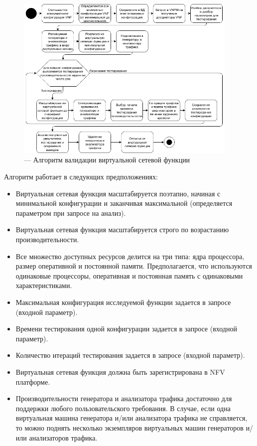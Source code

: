 \documentclass[oneside,final,14pt,a4paper]{extreport}
\begin{document}
\begin{figure}[h]
	\centering
	\includegraphics[width=0.95\textwidth]{analyse_vnf_algorithm}
	\caption{--- Алгоритм валидации виртуальной сетевой функции}
	\label{pic:analyse_vnf_algorithm}
\end{figure}

Алгоритм работает в следующих предположениях:
\begin{itemize}
    \item Виртуальная сетевая функция масштабируется поэтапно, начиная с минимальной конфигурации и заканчивая максимальной (определяется параметром при запросе на анализ).
    \item Виртуальная сетевая функция масштабируется строго по возрастанию производительности. 
    \item Все множество доступных ресурсов делится на три типа: ядра процессора, размер оперативной и постоянной памяти. Предполагается, что используются одинаковые процессоры, оперативная и постоянная память с одинаковыми характеристиками.
    \item Максимальная конфигурация исследуемой функции задается в запросе (входной параметр).
    \item Времени тестирования одной конфигурации задается в запросе (входной параметр).
    \item Количество итераций тестирования задается в запросе (входной параметр).
    \item Виртуальная сетевая функция должна быть зарегистрирована в NFV платформе.
    \item Производительности генератора и анализатора трафика достаточно для поддержки любого пользовательского требования. В случае, если одна виртуальная машина генератора и/или анализатора трафика не справляется, то можно поднять несколько экземпляров виртуальных машин генераторов и/или анализаторов трафика.
\end{itemize}
\end{document}
